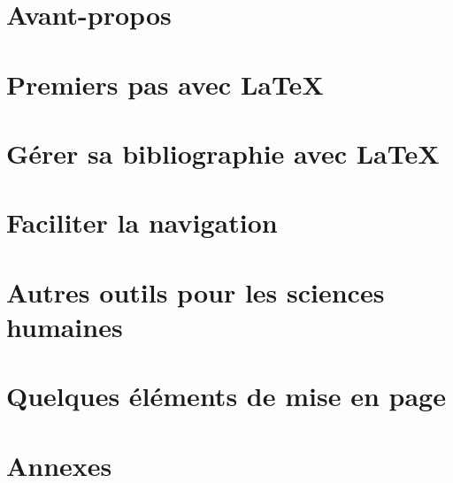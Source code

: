 \frontmatter
{}\part*{Avant-propos}



\mainmatter

\part{Premiers pas avec \LaTeX}








\part{Gérer sa bibliographie avec \LaTeX}\label{bibliographie}








\part{Faciliter la navigation}




\part{Autres outils pour les sciences humaines}

\label{ledmac}%



\part{Quelques éléments de mise en page}





\appendix
\part{Annexes}











\setcounter{tocdepth}{2}
\tableofcontents
